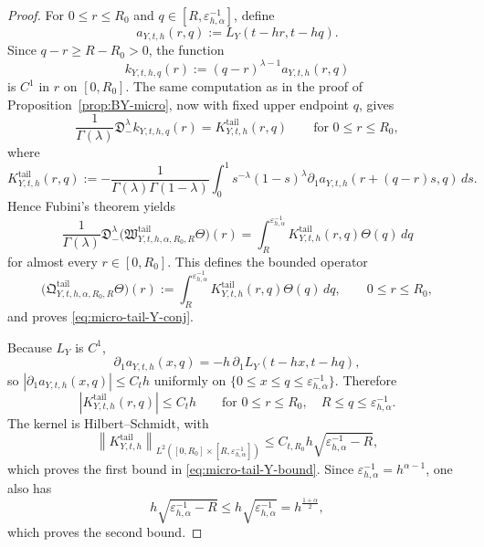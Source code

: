 \documentclass[11pt,a4paper]{amsart}
\theoremstyle{plain}
\theoremstyle{definition}
\theoremstyle{remark}
\begin{document}
\begin{proof}
For \(0\le r\le R_0\) and \(q\in[R,\varepsilon_{h,\alpha}^{-1}]\), define
\[
a_{Y,t,h}(r,q):=L_Y(t-hr,t-hq).
\]
Since \(q-r\ge R-R_0>0\), the function
\[
k_{Y,t,h,q}(r):=(q-r)^{\lambda-1}a_{Y,t,h}(r,q)
\]
is \(C^1\) in \(r\) on \([0,R_0]\). The same computation as in the proof of
Proposition~\ref{prop:BY-micro}, now with fixed upper endpoint \(q\), gives
\[
\frac{1}{\Gamma(\lambda)}
\mathfrak D_-^\lambda k_{Y,t,h,q}(r)
=
K_{Y,t,h}^{\mathrm{tail}}(r,q)
\qquad\text{for }0\le r\le R_0,
\]
where
\[
K_{Y,t,h}^{\mathrm{tail}}(r,q)
:=
-
\frac{1}{\Gamma(\lambda)\Gamma(1-\lambda)}
\int_0^1
s^{-\lambda}(1-s)^\lambda
\partial_1 a_{Y,t,h}(r+(q-r)s,q)\,ds.
\]
Hence Fubini's theorem yields
\[
\frac{1}{\Gamma(\lambda)}
\mathfrak D_-^\lambda
\bigl(
\mathfrak W_{Y,t,h,\alpha,R_0,R}^{\mathrm{tail}}\Theta
\bigr)(r)
=
\int_R^{\varepsilon_{h,\alpha}^{-1}}
K_{Y,t,h}^{\mathrm{tail}}(r,q)\Theta(q)\,dq
\]
for almost every \(r\in[0,R_0]\). This defines the bounded operator
\[
\bigl(
\mathfrak Q_{Y,t,h,\alpha,R_0,R}^{\mathrm{tail}}\Theta
\bigr)(r)
:=
\int_R^{\varepsilon_{h,\alpha}^{-1}}
K_{Y,t,h}^{\mathrm{tail}}(r,q)\Theta(q)\,dq,
\qquad 0\le r\le R_0,
\]
and proves \eqref{eq:micro-tail-Y-conj}.

Because \(L_Y\) is \(C^1\),
\[
\partial_1 a_{Y,t,h}(x,q)
=
-h\,\partial_1L_Y(t-hx,t-hq),
\]
so \(|\partial_1 a_{Y,t,h}(x,q)|\le C_t h\) uniformly on
\(\{0\le x\le q\le \varepsilon_{h,\alpha}^{-1}\}\). Therefore
\[
|K_{Y,t,h}^{\mathrm{tail}}(r,q)|\le C_t h
\qquad\text{for }0\le r\le R_0,\quad R\le q\le \varepsilon_{h,\alpha}^{-1}.
\]
The kernel is Hilbert--Schmidt, with
\[
\left\|
K_{Y,t,h}^{\mathrm{tail}}
\right\|_{L^2([0,R_0]\times [R,\varepsilon_{h,\alpha}^{-1}])}
\le
C_{t,R_0}h\sqrt{\varepsilon_{h,\alpha}^{-1}-R},
\]
which proves the first bound in \eqref{eq:micro-tail-Y-bound}. Since
\(\varepsilon_{h,\alpha}^{-1}=h^{\alpha-1}\), one also has
\[
h\sqrt{\varepsilon_{h,\alpha}^{-1}-R}
\le
h\sqrt{\varepsilon_{h,\alpha}^{-1}}
=
h^{\frac{1+\alpha}{2}},
\]
which proves the second bound.
\end{proof}
\end{document}
